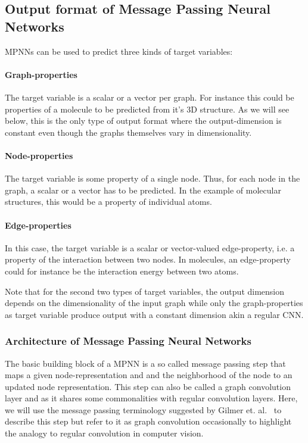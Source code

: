 \subsection{Output format of Message Passing Neural Networks}
\label{sec:graph-output}

MPNNs can be used to predict three kinds of target variables:

\paragraph{Graph-properties}
The target variable is a scalar or a vector per graph. For instance this could be properties of a molecule to be predicted from it's 3D structure. As we will see below, this is the only type of output format where the output-dimension is constant even though the graphs themselves vary in dimensionality.
\paragraph{Node-properties}
The target variable is some property of a single node. Thus, for each node in the graph, a scalar or a vector has to be predicted. In the example of molecular structures, this would be a property of individual atoms.
\paragraph{Edge-properties}
In this case, the target variable is a scalar or vector-valued edge-property, i.e. a property of the interaction between two nodes. In molecules, an edge-property could for instance be the interaction energy between two atoms.

Note that for the second two types of target variables, the output dimension depends on the dimensionality of the input graph while only the graph-properties as target variable produce output with a constant dimension akin a regular CNN.

\subsubsection{Architecture of Message Passing Neural Networks}


The basic building block of a MPNN is a so called message passing step that maps a given node-representation and and the neighborhood of the node to an updated node representation. This step can also be called a graph convolution layer and as it shares some commonalities with regular convolution layers. Here, we will use the message passing terminology suggested by Gilmer et. al.~\cite{Gilmer2017} to describe this step but refer to it as graph convolution occasionally to highlight the analogy to regular convolution in computer vision.

